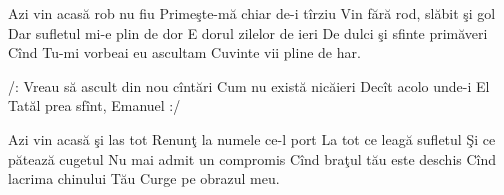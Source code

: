 
\beginverse
Azi vin acasă rob nu fiu
Primeşte-mă chiar de-i tîrziu
Vin fără rod, slăbit şi gol
Dar sufletul mi-e plin de dor
E dorul zilelor de ieri
De dulci şi sfinte primăveri
Cînd Tu-mi vorbeai eu ascultam
Cuvinte vii pline de har.
\endverse

\beginchorus
/: Vreau să ascult din nou cîntări
Cum nu există nicăieri
Decît acolo unde-i El
Tatăl prea sfînt, Emanuel :/
\endchorus

\beginverse
Azi vin acasă şi las tot
Renunţ la numele ce-l port
La tot ce leagă sufletul
Şi ce pătează cugetul
Nu mai admit un compromis
Cînd braţul tău este deschis
Cînd lacrima chinului Tău
Curge pe obrazul meu.
\endverse

\endsong